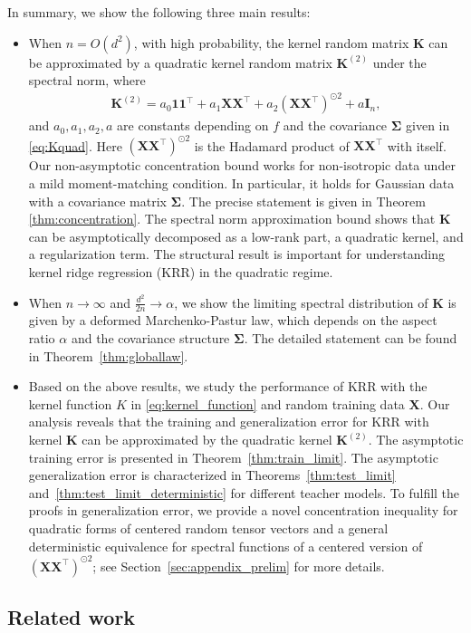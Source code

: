 \documentclass[twoside,11pt]{article}
\def\bI{{\mathbf I}}
\def\bK{{\boldsymbol K}}
\def\bX{{\boldsymbol X}}
\def\bSigma{{\boldsymbol \Sigma}}
\newcommand{\bKquad}{\bK^{(2)}}
\renewcommand{\bK}{\boldsymbol{K}}
\newcommand{\1}{\mathbf{1}}
\def\tran{^\top}
\def\one{\mathbf{1}}
\begin{document}
In summary, we show the following three main results:
\begin{itemize}
    \item When $n=O(d^2)$, with high probability, the kernel random matrix $\bK$ can be approximated by a quadratic kernel random matrix $\bK^{(2)}$ under the spectral norm, where 
\begin{align}\label{eq:Kquad_intro}
    \bKquad = a_0 \one\one\tran + a_1 \bX\bX\tran + a_2 (\bX\bX\tran)^{\odot 2} + a\bI_n,
\end{align}
and  $a_0,a_1,a_2,a$ are constants depending on $f$ and the covariance $\bSigma$ given in \eqref{eq:Kquad}. Here $(\bX\bX\tran)^{\odot 2}$ is the Hadamard product of $\bX\bX^\top$  with itself.   
 Our non-asymptotic concentration bound works for non-isotropic data under a mild moment-matching condition. In particular, it holds for  Gaussian data with a covariance matrix $\bSigma$. The precise statement is given in Theorem \ref{thm:concentration}. The spectral norm approximation bound shows that $\bK$ can be asymptotically decomposed as a low-rank part, a quadratic kernel, and a regularization term. The structural result is important for understanding kernel ridge regression (KRR) in the quadratic regime.
\item When $n\to\infty$ and $\frac{d^2}{2n}\to\alpha$, we show the limiting spectral distribution of $\bK$ is given by a deformed Marchenko-Pastur law, which depends on the aspect ratio $\alpha$ and the covariance structure $\bSigma$. The detailed statement can be found in Theorem~\ref{thm:globallaw}.
\item Based on the above results, we study the performance of KRR with the kernel function $K$ in \eqref{eq:kernel_function} and random training data $\bX$. Our analysis reveals that the training and generalization error for KRR with kernel $\bK$ can be approximated by the quadratic kernel  $\bK^{(2)}$.
The asymptotic training error is presented in Theorem~\ref{thm:train_limit}. The asymptotic generalization error is characterized in Theorems~\ref{thm:test_limit} and~\ref{thm:test_limit_deterministic} for different teacher models.
To fulfill the proofs in generalization error, we provide a novel concentration inequality for quadratic forms of centered random tensor vectors and a general deterministic equivalence for spectral functions of a centered version of $(\bX\bX\tran)^{\odot 2}$; see Section~\ref{sec:appendix_prelim} for more details.  
\end{itemize}


\subsection{Related work}
\end{document}
